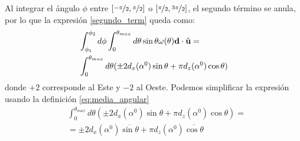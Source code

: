      Al integrar el ángulo  $\phi$ entre $[\nicefrac{-\pi}{2}, \nicefrac{\pi}{2}]$ o $[\nicefrac{\pi}{2}, \nicefrac{3\pi}{2}]$, el segundo término  se anula, por lo que la expresión \ref{segundo_term} queda como:
    \begin{align*}
        &\int_{\phi_1}^{\phi_2} d\phi \int_{0}^{\theta_{max}}  d\theta \sin\theta \omega(\theta)\textbf{d}\cdot\hat{\bf{u}} =\\
        &\int_{0}^{\theta_{max}}  d\theta (\pm 2d_x(\alpha^0)\sin\theta 
        + \pi d_z(\alpha^0)\cos\theta)
    \end{align*}     
    \noindent donde $+2$ corresponde al Este y $-2$ al Oeste. Podemos simplificar la expresión usando la definición \ref{eq:media_angular}
    \begin{align*}
    &\int_{0}^{\theta_{max}}  d\theta (\pm 2d_x(\alpha^0)\sin\theta 
    + \pi d_z(\alpha^0)\cos\theta)=\\ 
    & =\pm 2d_x(\alpha^0)\overline{\sin\theta} 
    + \pi d_z(\alpha^0)\overline{\cos\theta}\\
    \end{align*}



